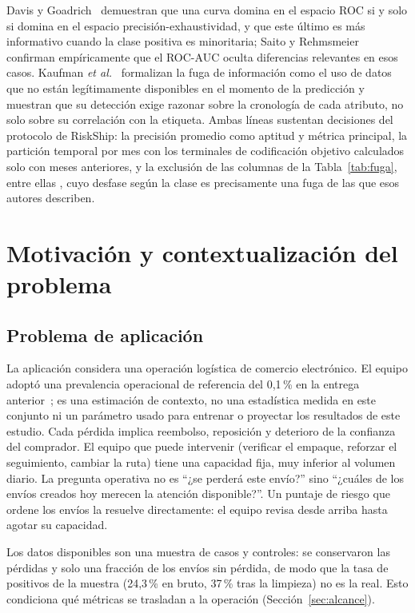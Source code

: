 \documentclass[conference]{IEEEtran}
\newcommand{\col}[1]{\texttt{\detokenize{#1}}}
\begin{document}
Davis y Goadrich~\cite{davis} demuestran que una curva domina en el espacio
ROC si y solo si domina en el espacio precisión-exhaustividad, y que este
último es más informativo cuando la clase positiva es minoritaria; Saito y
Rehmsmeier~\cite{saito} confirman empíricamente que el ROC-AUC oculta
diferencias relevantes en esos casos. Kaufman \textit{et al.}~\cite{kaufman}
formalizan la fuga de información como el uso de datos que no están
legítimamente disponibles en el momento de la predicción y muestran que su
detección exige razonar sobre la cronología de cada atributo, no solo sobre
su correlación con la etiqueta. Ambas líneas sustentan decisiones del
protocolo de RiskShip: la precisión promedio como aptitud y métrica principal,
la partición temporal por mes con los terminales de codificación objetivo
calculados solo con meses anteriores, y la exclusión de las columnas de la
Tabla~\ref{tab:fuga}, entre ellas \col{DATEPARAMETER}, cuyo desfase según la
clase es precisamente una fuga de las que esos autores describen.

\section{Motivación y contextualización del problema}

\subsection{Problema de aplicación}

La aplicación considera una operación logística de comercio electrónico. El
equipo adoptó una prevalencia operacional de referencia del 0,1\,\% en la
entrega anterior~\cite{informe_rna}; es una estimación de contexto, no una
estadística medida en este conjunto ni un parámetro usado para entrenar o
proyectar los resultados de este estudio. Cada pérdida
implica reembolso, reposición y deterioro de la confianza del comprador. El
equipo que puede intervenir (verificar el empaque, reforzar el seguimiento,
cambiar la ruta) tiene una capacidad fija, muy inferior al volumen diario. La
pregunta operativa no es ``¿se perderá este envío?'' sino ``¿cuáles de los
envíos creados hoy merecen la atención disponible?''. Un puntaje de riesgo que
ordene los envíos la resuelve directamente: el equipo revisa desde arriba
hasta agotar su capacidad.

Los datos disponibles son una muestra de casos y controles: se conservaron las
pérdidas y solo una fracción de los envíos sin pérdida, de modo que la tasa de
positivos de la muestra (24,3\,\% en bruto, 37\,\% tras la limpieza) no es la
real. Esto condiciona qué métricas se trasladan a la operación
(Sección~\ref{sec:alcance}).
\end{document}
